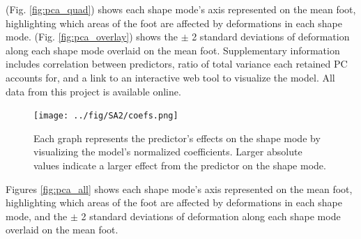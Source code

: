 \documentclass[defaultstyle,11pt]{thesis}
\begin{document}
(Fig. \ref{fig:pca_quad}) shows each shape mode's axis represented on the mean foot, highlighting which areas of the foot are affected by deformations in each shape mode.
(Fig. \ref{fig:pca_overlay}) shows the \(\pm\) 2 standard deviations of deformation along each shape mode overlaid on the mean foot.
Supplementary information includes correlation between predictors, ratio of total variance each retained PC accounts for, and a link to an interactive web tool to visualize the model.
All data from this project is available online.

\begin{figure}
\hypertarget{fig:SA2-coefs}{%
\centering
\texttt{[image: ../fig/SA2/coefs.png]}
\caption{Each graph represents the predictor's effects on the shape mode by visualizing the model's normalized coefficients. Larger absolute values indicate a larger effect from the predictor on the shape mode.}\label{fig:SA2-coefs}
}
\end{figure}

Figures \ref{fig:pca_all} shows each shape mode's axis represented on the mean foot, highlighting which areas of the foot are affected by deformations in each shape mode, and the \(\pm\) 2 standard deviations of deformation along each shape mode overlaid on the mean foot.

\begin{pandoccrossrefsubfigures}



\caption[{{[}A{]} Each shape mode's principal axis represented as a heatmap overlaid on the mean foot and shown from 4 different point-of-views. The darker regions represent vertices which are most correlated with the shape mode's principal axis, and therefore see deformations in the shape mode. {[}B{]} Foot shape deformation at +2 and -2 standard deviations along each shape mode's principal axis, overlaid on the mean foot. The point-of-view is set to highlight the major variance along each shape mode's axis.}]{{[}A{]} Each shape mode's principal axis represented as a heatmap overlaid on the mean foot and shown from 4 different point-of-views. The darker regions represent vertices which are most correlated with the shape mode's principal axis, and therefore see deformations in the shape mode. {[}B{]} Foot shape deformation at +2 and -2 standard deviations along each shape mode's principal axis, overlaid on the mean foot. The point-of-view is set to highlight the major variance along each shape mode's axis.}

\label{fig:pca_all}

\end{pandoccrossrefsubfigures}
\end{document}
